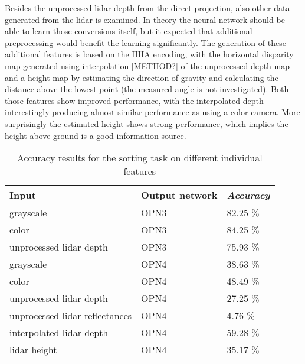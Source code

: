 Besides the unprocessed lidar depth from the direct projection, also other data generated from the lidar is examined. In theory the neural network should be able to learn those  
conversions itself, but it expected that additional preprocessing would benefit the learning significantly. The generation of these additional features is based on the HHA encoding\cite{gupta2013}, with the horizontal disparity map generated using interpolation [METHOD?] of the unprocessed depth map and a height map by estimating the direction of gravity and calculating the distance above the lowest point (the measured angle is not investigated). Both those features show improved performance, with the interpolated depth interestingly producing almost similar performance as using a color camera. More surprisingly the estimated height shows strong performance, which implies the height above ground is a good information source.
\begin{table}[]
\centering
\caption{Accuracy results for the sorting task on different individual features}
\label{tab:indiv_results}
\begin{tabular}{|p{7cm}|p{2cm}|p{2cm}|}
\hline
\textbf{Input}                                                          & \textbf{Output network} & \textit{\textbf{Accuracy}} \\ \hline
grayscale                                                               & OPN3                    & 82.25 \%                   \\ \hline
color                                                                   & OPN3                    & 84.25 \%                   \\ \hline
unprocessed lidar depth                                                 & OPN3                    & 75.93 \%                   \\ \hline
grayscale                                                               & OPN4                    & 38.63 \%                   \\ \hline
color                                                                   & OPN4                    & 48.49 \%                   \\ \hline
unprocessed lidar depth                                                 & OPN4                    & 27.25 \%                   \\ \hline
unprocessed lidar reflectances                                          & OPN4                    & 4.76 \%                   \\ \hline
interpolated lidar depth                                                & OPN4                    & 59.28 \%                   \\ \hline
lidar height                                                            & OPN4                    & 35.17 \%                   \\ \hline
\end{tabular}
\end{table}

